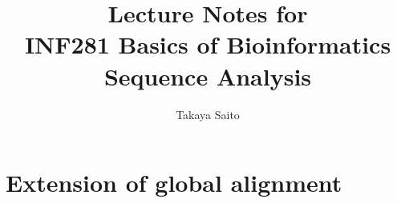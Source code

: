 \documentclass[12pt]{article}
\title{Lecture Notes for \\ INF281 Basics of Bioinformatics Sequence Analysis}
\author{Takaya Saito}
\date{}
\begin{document}
\setcounter{page}{18}

\makeatletter 
\renewcommand{\thefigure}{\arabic{section}.\arabic{figure}}
\renewcommand{\thetable}{\arabic{section}.\arabic{table}}
\makeatother

%
%
\setcounter{section}{2}
\setcounter{figure}{0}
\setcounter{table}{0}
\section{Extension of global alignment}

\newpage


\end{document}
